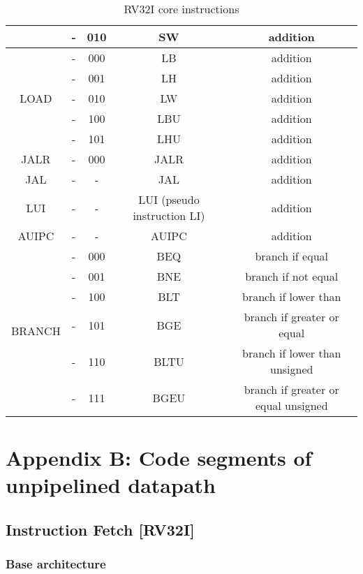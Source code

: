\begin{table}[ht]
\begin{center}
\begin{tabular}{|c|c|c|c|c|}
            & - & 010 & SW & addition\\
            \hline
            \multirow{5}{*}{LOAD} & - & 000 & LB & addition\\
            & - & 001 & LH & addition\\
            & - & 010 & LW & addition\\
            & - & 100 & LBU & addition\\
            & - & 101 & LHU & addition\\
            \hline
            JALR & - & 000 & JALR & addition\\
            \hline
            JAL & - & - & JAL & addition\\
            \hline
            LUI & - & - & LUI (pseudo instruction LI) & addition\\
            \hline
            AUIPC & - & - & AUIPC & addition\\
            \hline
            \multirow{6}{*}{BRANCH} & - & 000 & BEQ & branch if equal\\
            & - & 001 & BNE & branch if not equal\\
            & - & 100 & BLT & branch if lower than\\
            & - & 101 & BGE & branch if greater or equal\\
            & - & 110 & BLTU & branch if lower than unsigned\\
            & - & 111 & BGEU & branch if greater or equal unsigned\\
            \hline
        \end{tabular}
        \caption{RV32I core instructions}
        \label{table:core_instr}
    \end{center}
\end{table}

\section{Appendix B: Code segments of unpipelined datapath}

\subsection{Instruction Fetch [RV32I]}

\subsubsection{Base architecture}
\begin{code}
\label{code:IF_code}   
\inputminted[fontsize=\footnotesize]{vhdl}{\srcfolder instr_fetch.vhd}
\end{code}
\newpage


